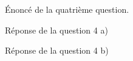 
\begin{Question}
    Énoncé de la quatrième question.   
\end{Question}

\begin{Answer}
    Réponse de la question 4 a)
\end{Answer}

\begin{Answer} 
    Réponse de la question 4 b)
\end{Answer}

